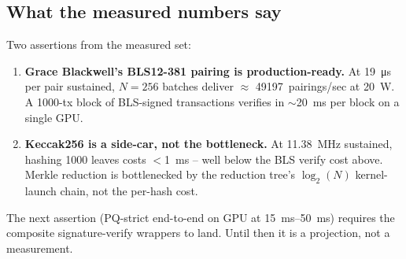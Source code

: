 \subsection{What the measured numbers say}

Two assertions from the measured set:

\begin{enumerate}[leftmargin=2em,nosep]
\item \textbf{Grace Blackwell's BLS12-381 pairing is
  production-ready.} At \SI{19}{\micro\second} per pair
  sustained, $N{=}256$ batches deliver $\approx$
  \num{49197}~pairings/sec at \SI{20}{\watt}. A 1000-tx block
  of BLS-signed transactions verifies in
  $\sim$\SI{20}{\milli\second} per block on a single GPU.
\item \textbf{Keccak256 is a side-car, not the bottleneck.}
  At \SI{11.38}{\mega\hertz} sustained, hashing 1000 leaves
  costs $<$\SI{1}{\milli\second} -- well below the BLS verify
  cost above. Merkle reduction is bottlenecked by the
  reduction tree's $\log_2(N)$ kernel-launch chain, not the
  per-hash cost.
\end{enumerate}

The next assertion (PQ-strict end-to-end on GPU at
\SI{15}{\milli\second}--\SI{50}{\milli\second}) requires the
composite signature-verify wrappers to land. Until then it is a
projection, not a measurement.
